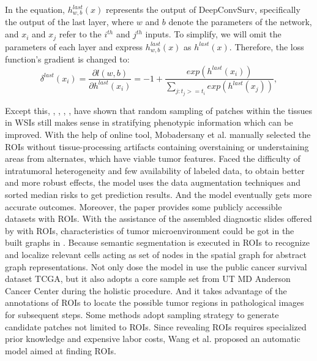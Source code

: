 \documentclass[journal,twoside,web]{ieeecolor}
\begin{document}
In the equation, $h_{w,b}^{last}(x)$ represents the output of DeepConvSurv, specifically the output of the last layer, where $w$ and $b$ denote the parameters of the network, and $x_i$ and $x_j$ refer to the $i^{th}$ and $j^{th}$ inputs. To simplify, we will omit the parameters of each layer and express $h_{w,b}^{last}(x)$ as $h^{last}(x)$.
Therefore, the loss function's gradient is changed to:
\begin{equation}
\delta^{last}(x_i)=\frac{\partial l(w,b)}{\partial h^{last}(x_i)}=-1+\frac{exp(h^{last}(x_i))}{\sum_{j:t_j>=t_i}exp(h^{last}(x_j))},
\end{equation}

Except this, \cite{zhu2017wsisa}, \cite{di2020ranking}, \cite{yao2020whole}, \cite{abbet2020divide}, \cite{yao2019deep} have shown that random sampling of patches within the tissues in WSIs still makes sense in stratifying phenotypic information which can be improved.
With the help of online tool, Mobadersany et al.\cite{mobadersany2018predicting} manually selected the ROIs without tissue-processing artifacts containing overstaining or understaining areas from alternates, which have viable tumor features. 
Faced the difficulty of intratumoral heterogeneity and few availability of labeled data, to obtain better and more robust effects, the model uses the data augmentation techniques and sorted median risks to get prediction results.
And the model eventually gets more accurate outcomes. 
Moreover, the paper provides some publicly accessible datasets with ROIs.
With the assistance of the assembled diagnostic slides offered by \cite{mobadersany2018predicting} with ROIs, characteristics of tumor microenvironment could be got in the built graphs in \cite{chen2020pathomic}.
Because semantic segmentation is executed in ROIs to recognize and localize relevant cells acting as set of nodes in the spatial graph for abstract graph representations.
Not only dose the model in \cite{yao2017deep} use the public cancer survival dataset TCGA, but it also adopts a core sample set from UT MD Anderson Cancer Center during the holistic procedure.
And it takes advantage of the annotations of ROIs to locate the possible tumor regions in pathological images for subsequent steps.
Some methods adopt sampling strategy to generate candidate patches not limited to ROIs.
Since revealing ROIs requires specialized prior knowledge and expensive labor costs, Wang et al. proposed an automatic model aimed at finding ROIs.
\end{document}
